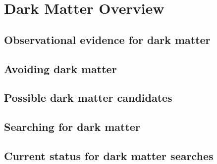 \chapter{Dark Matter Overview}
\label{chpt:DM_Overview}
\section{Observational evidence for dark matter}

\section{Avoiding dark matter}

\section{Possible dark matter candidates}

\section{Searching for dark matter}

\section{Current status for dark matter searches}